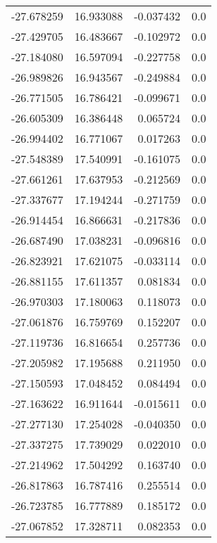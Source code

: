 \begin{tabular}{rrrr}
      -27.678259 &        16.933088 &   -0.037432 &   0.0 \\
      -27.429705 &        16.483667 &   -0.102972 &   0.0 \\
      -27.184080 &        16.597094 &   -0.227758 &   0.0 \\
      -26.989826 &        16.943567 &   -0.249884 &   0.0 \\
      -26.771505 &        16.786421 &   -0.099671 &   0.0 \\
      -26.605309 &        16.386448 &    0.065724 &   0.0 \\
      -26.994402 &        16.771067 &    0.017263 &   0.0 \\
      -27.548389 &        17.540991 &   -0.161075 &   0.0 \\
      -27.661261 &        17.637953 &   -0.212569 &   0.0 \\
      -27.337677 &        17.194244 &   -0.271759 &   0.0 \\
      -26.914454 &        16.866631 &   -0.217836 &   0.0 \\
      -26.687490 &        17.038231 &   -0.096816 &   0.0 \\
      -26.823921 &        17.621075 &   -0.033114 &   0.0 \\
      -26.881155 &        17.611357 &    0.081834 &   0.0 \\
      -26.970303 &        17.180063 &    0.118073 &   0.0 \\
      -27.061876 &        16.759769 &    0.152207 &   0.0 \\
      -27.119736 &        16.816654 &    0.257736 &   0.0 \\
      -27.205982 &        17.195688 &    0.211950 &   0.0 \\
      -27.150593 &        17.048452 &    0.084494 &   0.0 \\
      -27.163622 &        16.911644 &   -0.015611 &   0.0 \\
      -27.277130 &        17.254028 &   -0.040350 &   0.0 \\
      -27.337275 &        17.739029 &    0.022010 &   0.0 \\
      -27.214962 &        17.504292 &    0.163740 &   0.0 \\
      -26.817863 &        16.787416 &    0.255514 &   0.0 \\
      -26.723785 &        16.777889 &    0.185172 &   0.0 \\
      -27.067852 &        17.328711 &    0.082353 &   0.0 \\

\end{tabular}
